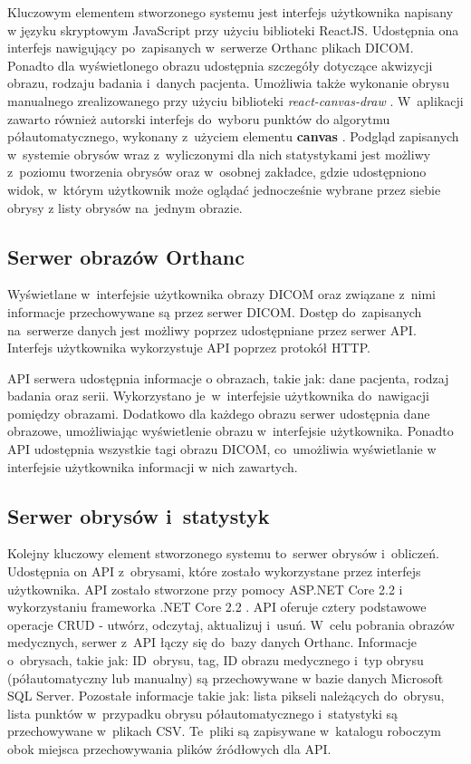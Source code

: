 \documentclass[a4paper,11pt,twoside,openright]{report}
\theoremstyle{definition}
\begin{document}
Kluczowym elementem stworzonego systemu jest interfejs użytkownika napisany w
języku skryptowym JavaScript przy użyciu biblioteki ReactJS. Udostępnia ona
interfejs nawigujący po~zapisanych w~serwerze Orthanc plikach DICOM. Ponadto dla
wyświetlonego obrazu udostępnia szczegóły dotyczące akwizycji obrazu, rodzaju badania i~danych pacjenta.
Umożliwia także wykonanie obrysu manualnego zrealizowanego przy użyciu biblioteki
\textit{react-canvas-draw} \cite{React canvas draw}. W~aplikacji zawarto również autorski interfejs do~wyboru punktów
do algorytmu półautomatycznego, wykonany z~użyciem elementu \textbf{canvas} \cite{Canvas}.
Podgląd zapisanych w~systemie obrysów wraz z~wyliczonymi dla nich statystykami
jest możliwy z~poziomu tworzenia obrysów oraz w~osobnej zakładce, gdzie udostępniono
widok, w~którym użytkownik może oglądać jednocześnie wybrane przez siebie obrysy
z listy obrysów na~jednym obrazie.

\subsection {Serwer obrazów Orthanc}

Wyświetlane w~interfejsie użytkownika obrazy DICOM oraz związane z~nimi informacje
przechowywane są przez serwer DICOM. Dostęp do~zapisanych na~serwerze danych jest
możliwy poprzez udostępniane przez serwer API. Interfejs użytkownika wykorzystuje
API poprzez protokół HTTP.

API serwera udostępnia informacje o obrazach, takie jak: dane pacjenta,
rodzaj badania oraz serii. Wykorzystano je~w~interfejsie użytkownika do~nawigacji pomiędzy
obrazami. Dodatkowo dla każdego obrazu serwer udostępnia dane obrazowe, umożliwiając
wyświetlenie obrazu w~interfejsie użytkownika. Ponadto API udostępnia wszystkie
tagi obrazu DICOM, co~umożliwia wyświetlanie w interfejsie użytkownika informacji
w nich zawartych.

\subsection {Serwer obrysów i~statystyk}
Kolejny kluczowy element stworzonego systemu to~serwer obrysów i~obliczeń. Udostępnia
on API z~obrysami, które zostało wykorzystane przez interfejs użytkownika. API zostało
stworzone przy pomocy ASP.NET Core 2.2 \cite{ASPNET} i wykorzystaniu frameworka
.NET Core 2.2 \cite{Charakterystyka dotnet}. API oferuje cztery podstawowe operacje CRUD
- utwórz, odczytaj, aktualizuj i~usuń. W~celu pobrania obrazów medycznych, serwer z~API
łączy się do~bazy danych Orthanc. Informacje o~obrysach, takie jak: ID~obrysu, tag,
ID obrazu medycznego i~typ obrysu (półautomatyczny lub manualny) są przechowywane
w bazie danych Microsoft SQL Server. Pozostałe informacje takie jak: lista pikseli
należących do~obrysu, lista punktów w~przypadku obrysu półautomatycznego i~statystyki
są przechowywane w~plikach CSV. Te~pliki są zapisywane w~katalogu roboczym obok
miejsca przechowywania plików źródłowych dla API.
\end{document}
